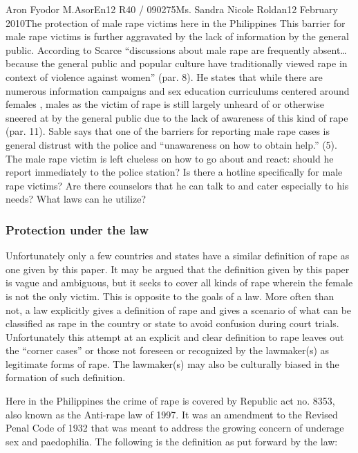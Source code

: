 \documentclass[12pt,letterpaper]{article}
\begin{document}
\begin{mla}{Aron Fyodor M.}{Asor}{En12 R40 / 090275}{Ms. Sandra Nicole Roldan}{12 February 2010}{The protection of male rape victims here in the Philippines}
This barrier for male rape victims is further aggravated by the lack of information by the general public. According to Scarce ``discussions about male rape are frequently absent\ldots because the general public and popular culture have traditionally viewed rape in context of violence against women'' (par. 8). He states that while there are numerous information campaigns and sex education curriculums centered around females , males as the victim of rape is still largely unheard of or otherwise sneered at by the general public due to the lack of awareness of this kind of rape (par. 11). Sable says that one of the barriers for reporting male rape cases is general distrust with the police and ``unawareness on how to obtain help.'' (5). The male rape victim is left clueless on how to go about and react: should he report immediately to the police station? Is there a hotline specifically for male rape victims? Are there counselors that he can talk to and cater especially to his needs? What laws can he utilize?

\subsubsection{Protection under the law}
%
%
\tab Unfortunately only a few countries and states have a similar definition of rape as one given by this paper. It may be argued that the definition given by this paper is vague and ambiguous, but it seeks to cover all kinds of rape wherein the female is not the only victim. This is opposite to the goals of a law. More often than not, a law explicitly gives a definition of rape and gives a scenario of what can be classified as rape in the country or state to avoid confusion during court trials. Unfortunately this attempt at an explicit and clear definition to rape leaves out the ``corner cases'' or those not foreseen or recognized by the lawmaker(s) as legitimate forms of rape. The lawmaker(s) may also be culturally biased in the formation of such definition. 

Here in the Philippines the crime of rape is covered by Republic act no. 8353, also known as the Anti-rape law of 1997. It was an amendment to the Revised Penal Code of 1932 that was meant to address the growing concern of underage sex and paedophilia. The following is the definition as put forward by the law:


\end{mla}
\end{document}
